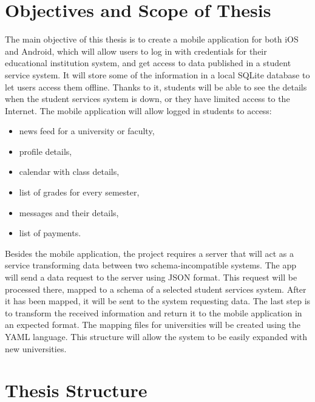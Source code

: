 

\section{Objectives and Scope of Thesis}
The main objective of this thesis is to create a mobile application for both iOS and Android, which will allow users to log in with credentials for their educational institution system, and get access to data published in a student service system. It will store some of the information in a local SQLite database to let users access them offline. Thanks to it, students will be able to see the details when the student services system is down, or they have limited access to the Internet. 
The mobile application will allow logged in students to access:
\begin{itemize}
    \item news feed for a university or faculty,
    \item profile details,
    \item calendar with class details,
    \item list of grades for every semester,
    \item messages and their details,
    \item list of payments.
\end{itemize}

Besides the mobile application, the project requires a server that will act as a service transforming data between two schema-incompatible systems. The app will send a data request to the server using JSON format. This request will be processed there, mapped to a schema of a selected student services system. After it has been mapped, it will be sent to the system requesting data. The last step is to transform the received information and return it to the mobile application in an expected format. The mapping files for universities will be created using the YAML language. This structure will allow the system to be easily expanded with new universities.

\section{Thesis Structure}
